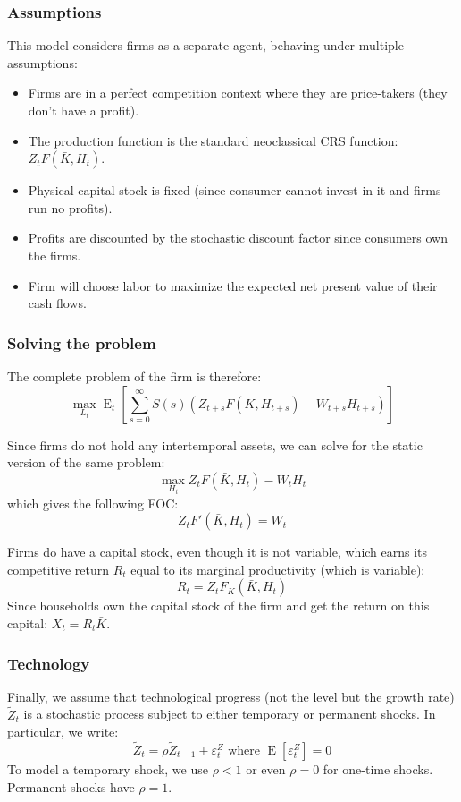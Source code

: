 \documentclass[12pt]{report}
\newcommand{\E}[1]{\operatorname{E}\left[#1\right]}
\newcommand{\Et}[1]{\operatorname{E}_t\left[#1\right]}
\begin{document}
\subsubsection{Assumptions}

This model considers firms as a separate agent, behaving under multiple assumptions:\begin{itemize}
\item Firms are in a perfect competition context where they are price-takers (they don't have a profit).
\item The production function is the standard neoclassical CRS function: $Z_tF(\bar K, H_t)$.
\item Physical capital stock is fixed (since consumer cannot invest in it and firms run no profits).
\item Profits are discounted by the stochastic discount factor since consumers own the firms.\item Firm will choose labor to maximize the expected net present value of their cash flows.
\end{itemize}

\subsubsection{Solving the problem}

The complete problem of the firm is therefore:$$\max_{L_t} \Et{\sum_{s=0}^{\infty} S(s)\left(Z_{t+s}F(\bar K, H_{t+s}) - W_{t+s}H_{t+s}\right)} $$

Since firms do not hold any intertemporal assets, we can solve for the static version of the same problem: $$\max_{H_t} Z_{t}F(\bar K, H_{t}) - W_{t}H_{t} $$ which gives the following FOC:\begin{equation}
Z_t F'(\bar K, H_{t}) = W_t
\end{equation}

Firms do have a capital stock, even though it is not variable, which earns its competitive return $R_t$ equal to its marginal productivity (which is variable): $$R_t = Z_t F_K(\bar K, H_t)$$ Since households own the capital stock of the firm and get the return on this capital: $ X_t =R_t\bar K $.

\subsubsection{Technology}

Finally, we assume that technological progress (not the level but the growth rate) $\tilde Z_t$ is a stochastic process subject to either temporary or permanent shocks. In particular, we write: $$\tilde Z_t = \rho \tilde Z_{t-1} + \varepsilon_{t}^Z \text{ where } \E{\varepsilon_{t}^Z} = 0 $$ To model a temporary shock, we use $\rho < 1$ or even $\rho = 0$ for one-time shocks. Permanent shocks have $\rho = 1$.
\end{document}
